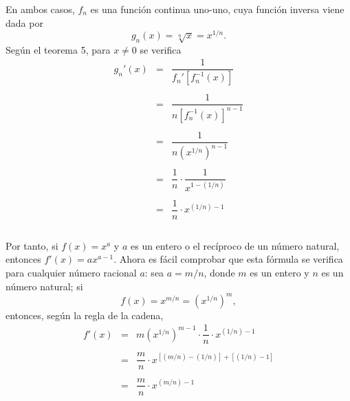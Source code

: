 En ambos casos, $f_n$ es una función continua uno-uno, cuya función inversa viene dada por
$$g_n(x)=\sqrt[n]{x}=x^{1/n}.$$
Según el teorema 5, para $x\neq 0$ se verifica
$$
\begin{array}{rcl}
    g_n'(x)&=&\dfrac{1}{f_n'\left[f_n^{-1}(x)\right]}\\\\
	   &=& \dfrac{1}{n\left[f_n^{-1}(x)\right]^{n-1}}\\\\
	   &=& \dfrac{1}{n\left(x^{1/n}\right)^{n-1}}\\\\
	   &=& \dfrac{1}{n} \cdot \dfrac{1}{x^{1-(1/n)}}\\\\
	   &=& \dfrac{1}{n}\cdot x^{(1/n)-1}\\\\
\end{array}
$$

Por tanto, si $f(x)=x^a$ y $a$ es un entero o el recíproco de un número natural, entonces $f'(x)=ax^{a-1}$. Ahora es fácil comprobar que esta fórmula se verifica para cualquier número racional $a$: sea $a=m/n$, donde $m$ es un entero y $n$ es un número natural; si
$$f(x)=x^{m/n}=\left(x^{1/n}\right)^m,$$
entonces, según la regla de la cadena,
$$
\begin{array}{rcl}
    f'(x) &=& m\left(x^{1/n}\right)^{m-1}\cdot \dfrac{1}{n} \cdot x^{(1/n)-1}\\\\
	  &=& \dfrac{m}{n} \cdot x^{[(m/n)-(1/n)]+[(1/n)-1]}\\\\
	  &=& \dfrac{m}{n} \cdot x^{(m/n)-1}\\\\
\end{array}
$$


